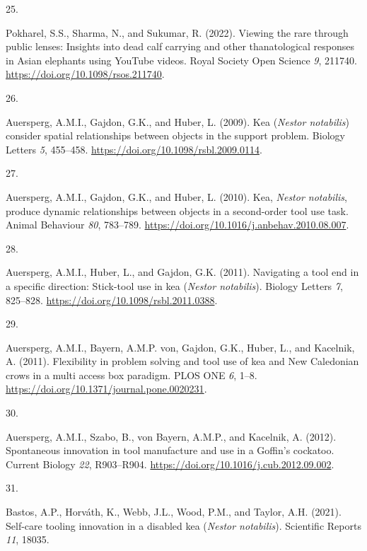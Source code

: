 \documentclass[
  man, donotrepeattitle,floatsintext]{apa6}
\newlength{\cslhangindent}
\newlength{\csllabelwidth}
\newlength{\cslentryspacingunit} %
\newenvironment{CSLReferences}[2] %
 {%
  \setlength{\parindent}{0pt}
  \ifodd #1
  \let\oldpar\par
  \def\par{\hangindent=\cslhangindent\oldpar}
  \fi
  \setlength{\parskip}{#2\cslentryspacingunit}
 }%
 {}
\newcommand{\CSLLeftMargin}[1]{\parbox[t]{\csllabelwidth}{#1}}
\newcommand{\CSLRightInline}[1]{\parbox[t]{\linewidth - \csllabelwidth}{#1}\break}
\begin{document}
\begin{CSLReferences}{0}{0}
\leavevmode{}%
\CSLLeftMargin{25. }%
\CSLRightInline{Pokharel, S.S., Sharma, N., and Sukumar, R. (2022). Viewing the rare through public lenses: Insights into dead calf carrying and other thanatological responses in {A}sian elephants using YouTube videos. Royal Society Open Science \emph{9}, 211740. \url{https://doi.org/10.1098/rsos.211740}.}

\leavevmode{}%
\CSLLeftMargin{26. }%
\CSLRightInline{Auersperg, A.M.I., Gajdon, G.K., and Huber, L. (2009). Kea (\emph{{N}estor notabilis}) consider spatial relationships between objects in the support problem. Biology Letters \emph{5}, 455--458. \url{https://doi.org/10.1098/rsbl.2009.0114}.}

\leavevmode{}%
\CSLLeftMargin{27. }%
\CSLRightInline{Auersperg, A.M.I., Gajdon, G.K., and Huber, L. (2010). Kea, \emph{{N}estor notabilis}, produce dynamic relationships between objects in a second-order tool use task. Animal Behaviour \emph{80}, 783--789. \url{https://doi.org/10.1016/j.anbehav.2010.08.007}.}

\leavevmode{}%
\CSLLeftMargin{28. }%
\CSLRightInline{Auersperg, A.M.I., Huber, L., and Gajdon, G.K. (2011). Navigating a tool end in a specific direction: Stick-tool use in kea (\emph{{N}estor notabilis}). Biology Letters \emph{7}, 825--828. \url{https://doi.org/10.1098/rsbl.2011.0388}.}

\leavevmode{}%
\CSLLeftMargin{29. }%
\CSLRightInline{Auersperg, A.M.I., Bayern, A.M.P. von, Gajdon, G.K., Huber, L., and Kacelnik, A. (2011). Flexibility in problem solving and tool use of kea and {N}ew {C}aledonian crows in a multi access box paradigm. PLOS ONE \emph{6}, 1--8. \url{https://doi.org/10.1371/journal.pone.0020231}.}

\leavevmode{}%
\CSLLeftMargin{30. }%
\CSLRightInline{Auersperg, A.M.I., Szabo, B., von Bayern, A.M.P., and Kacelnik, A. (2012). Spontaneous innovation in tool manufacture and use in a {G}offin's cockatoo. Current Biology \emph{22}, R903--R904. \url{https://doi.org/10.1016/j.cub.2012.09.002}.}

\leavevmode{}%
\CSLLeftMargin{31. }%
\CSLRightInline{Bastos, A.P., Horváth, K., Webb, J.L., Wood, P.M., and Taylor, A.H. (2021). Self-care tooling innovation in a disabled kea (\emph{{N}estor notabilis}). Scientific Reports \emph{11}, 18035.}


\end{CSLReferences}
\end{document}
